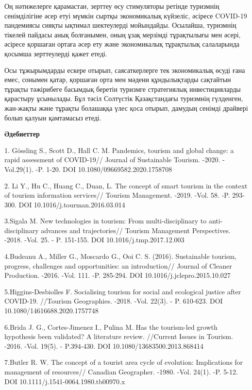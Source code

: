 Оң нәтижелерге қарамастан, зерттеу өсу стимуляторы ретінде туризмнің
сенімділігіне әсер етуі мүмкін сыртқы экономикалық күйзеліс, әсіресе
COVID-19 пандемиясы сияқты ықтимал шектеулерді мойындайды. Осылайша,
туризмнің тікелей пайдасы анық болғанымен, оның ұзақ мерзімді
тұрақтылығы мен әсері, әсіресе қоршаған ортаға әсер ету және
экономикалық тұрақтылық салаларында қосымша зерттеулерді қажет етеді.

Осы тұжырымдарды ескере отырып, саясаткерлерге тек экономикалық өсуді
ғана емес, сонымен қатар, қоршаған орта мен мәдени құндылықтарды
сақтайтын тұрақты тәжірибеге басымдық беретін туризмге стратегиялық
инвестицияларды қарастыру ұсынылады. Бұл тәсіл Солтүстік Қазақстандағы
туризмнің гүлденген, жан-жақты және тұрақты болашаққа үлес қоса отырып,
дамудың сенімді драйвері болып қалуын қамтамасыз етеді.

{\bfseries Әдебиеттер}

1. Gössling S., Scott D., Hall C. M. Pandemics, tourism and global
change: a rapid assessment of COVID-19// Journal of Sustainable Tourism.
-2020. -Vol.29(1). -P. 1-20. DOI 10.1080/09669582.2020.1758708

2. Li Y., Hu C., Huang C., Duan, L. The concept of smart tourism in the
context of tourism information services// Tourism Management. -2019.
-Vol. 58. -P. 293-300. DOI 10.1016/j.tourman.2016.03.014

3.Sigala M. New technologies in tourism: From multi-disciplinary to
anti-disciplinary advances and trajectories// Tourism Management
Perspectives. -2018. -Vol. 25. - P. 151-155. DOI
10.1016/j.tmp.2017.12.003

4.Budeanu A., Miller G., Moscardo G., Ooi C. S. (2016). Sustainable
tourism, progress, challenges and opportunities: an introduction//
Journal of Cleaner Production. -2016. -Vol. 111. -P. 285-294. DOI
10.1016/j.jclepro.2015.10.027

5.Higgins-Desbiolles F. Socialising tourism for social and ecological
justice after COVID-19. //Tourism Geographies. -2018. -Vol. 22(3). - P.
610-623. DOI 10.1080/14616688.2020.1757748

6.Brida J. G., Cortes-Jimenez I., Pulina M. Has the tourism-led growth
hypothesis been validated? A literature review. //Current Issues in
Tourism. -2016. -Vol. 19(5). - P.394-430. DOI
10.1080/13683500.2013.868414

7.Butler R. W. The concept of a tourist area cycle of evolution:
Implications for management of resources// Canadian Geographer. -1980.
-Vol. 24(1). -P. 5-12. DOI 10.1111/j.1541-0064.1980.tb00970.x

